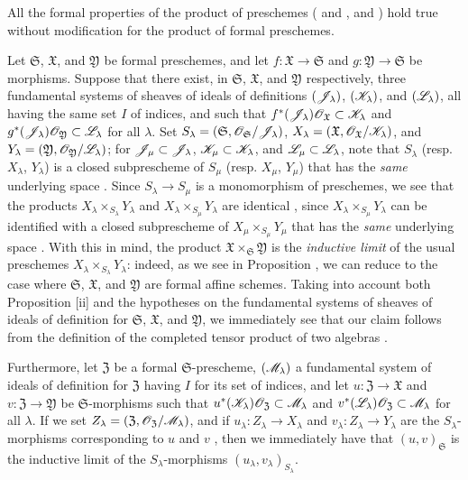 All the formal properties of the product of preschemes ( and ,  and ) hold true without modification for the product of formal preschemes.

\begin{env}[10.7.4]
\label{1.10.7.4}
Let $\mathfrak{S}$, $\mathfrak{X}$, and $\mathfrak{Y}$ be formal preschemes, and let $f:\mathfrak{X}\to\mathfrak{S}$ and $g:\mathfrak{Y}\to\mathfrak{S}$ be morphisms.
Suppose that there exist, in $\mathfrak{S}$, $\mathfrak{X}$, and $\mathfrak{Y}$ respectively, three fundamental systems of sheaves of ideals of definitions $(\mathscr{J}_\lambda)$, $(\mathscr{K}_\lambda)$, and $(\mathscr{L}_\lambda)$, all having the same set $I$ of indices, and such that $f^*(\mathscr{J}_\lambda)\mathscr{O}_\mathfrak{X}\subset\mathscr{K}_\lambda$ and $g^*(\mathscr{J}_\lambda)\mathscr{O}_\mathfrak{Y}\subset\mathscr{L}_\lambda$ for all $\lambda$.
Set $S_\lambda=(\mathfrak{S},\mathscr{O}_\mathfrak{S}/\mathscr{J}_\lambda)$, $X_\lambda=(\mathfrak{X},\mathscr{O}_\mathfrak{X}/\mathscr{K}_\lambda)$, and $Y_\lambda=(\mathfrak{Y},\mathscr{O}_\mathfrak{Y}/\mathscr{L}_\lambda)$; for $\mathscr{J}_\mu\subset\mathscr{J}_\lambda$, $\mathscr{K}_\mu\subset\mathscr{K}_\lambda$, and $\mathscr{L}_\mu\subset\mathscr{L}_\lambda$, note that $S_\lambda$ (resp. $X_\lambda$, $Y_\lambda$) is a closed subprescheme of $S_\mu$ (resp. $X_\mu$, $Y_\mu$) that has the \emph{same}
underlying space .
Since $S_\lambda\to S_\mu$ is a monomorphism of preschemes, we see that the products $X_\lambda\times_{S_\lambda}Y_\lambda$ and $X_\lambda\times_{S_\mu}Y_\lambda$ are identical , since $X_\lambda\times_{S_\mu}Y_\lambda$ can be identified with a closed subprescheme of $X_\mu\times_{S_\mu}Y_\mu$ that has the \emph{same} underlying space .
With this in mind, the product $\mathfrak{X}\times_\mathfrak{S}\mathfrak{Y}$ is the \emph{inductive limit} of the usual preschemes $X_\lambda\times_{S_\lambda}Y_\lambda$: indeed, as we see in Proposition , we can reduce to the case where $\mathfrak{S}$, $\mathfrak{X}$, and $\mathfrak{Y}$ are formal affine schemes.
Taking into account both Proposition [ii] and the hypotheses on the fundamental systems of sheaves of ideals of definition for $\mathfrak{S}$, $\mathfrak{X}$, and $\mathfrak{Y}$, we immediately see that our claim follows from the definition of the completed tensor product of two algebras .

Furthermore, let $\mathfrak{Z}$ be a formal $\mathfrak{S}$-prescheme, $(\mathscr{M}_\lambda)$ a fundamental system of ideals of definition for $\mathfrak{Z}$ having $I$ for its set of indices, and let $u:\mathfrak{Z}\to\mathfrak{X}$ and $v:\mathfrak{Z}\to\mathfrak{Y}$ be $\mathfrak{S}$-morphisms such that $u^*(\mathscr{K}_\lambda)\mathscr{O}_\mathfrak{Z}\subset\mathscr{M}_\lambda$ and $v^*(\mathscr{L}_\lambda)\mathscr{O}_\mathfrak{Z}\subset\mathscr{M}_\lambda$ for all $\lambda$.
If we set $Z_\lambda=(\mathfrak{Z},\mathscr{O}_\mathfrak{Z}/\mathscr{M}_\lambda)$, and if $u_\lambda:Z_\lambda\to X_\lambda$ and $v_\lambda:Z_\lambda\to Y_\lambda$ are the $S_\lambda$-morphisms corresponding to $u$ and $v$ , then we immediately have that $(u,v)_\mathfrak{S}$ is the inductive limit of the $S_\lambda$-morphisms $(u_\lambda,v_\lambda)_{S_\lambda}$.


\end{env}
